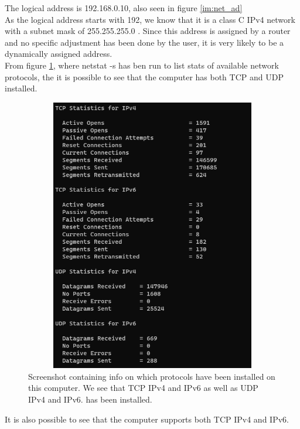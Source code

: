 \documentclass[11pt, A4paper, english]{article}
\begin{document}
The logical address is 192.168.0.10, also seen in figure \ref{im:net_ad} \\
As the logical address starts with 192, we know that it is a class C IPv4 network with a subnet mask of 255.255.255.0 \cite{IPClasses}. Since this address is assigned by a router and no specific adjustment has been done by the user, it is very likely to be a dynamically assigned address. \\
From figure \ref{im:pro_installed}, where netstat -s has ben run to list stats of available network protocols, the it is possible to see that the computer has both TCP and UDP installed.
			\begin{figure}
\includegraphics[width=12.6cm, height=12cm]{installed_protocols.png}
\caption{Screenshot containing info on which protocols have been installed on this computer. We see that TCP IPv4 and IPv6 as well as UDP IPv4 and IPv6. has been installed.}
\label{im:pro_installed}	
			\end{figure}
It is also possible to see that the computer supports both TCP IPv4 and IPv6. \\
\end{document}
